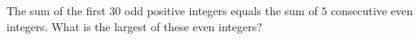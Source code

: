 The sum of the first $30$ odd positive integers equals the sum of $5$ consecutive even integers. What is the largest of these even integers?
